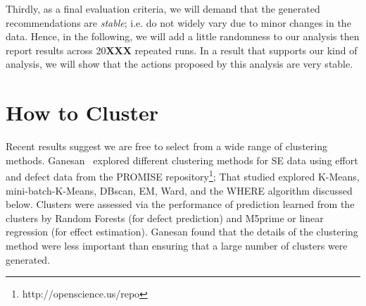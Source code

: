 \documentclass[conference]{IEEEtran}
\begin{document}
Thirdly, as a final evaluation criteria, we will demand that the generated recommendations are {\em stable}; i.e. do not widely vary due to minor changes in the data. Hence, in the following, we will add a little randomness to our analysis then report results across 20{\bf XXX} repeated runs. In a result that supports our kind of analysis, we will show that the actions proposed by this analysis are very stable.

	
	\section{How to Cluster}
	Recent results suggest  we are free to select from a wide range of 
	clustering methods.  Ganesan~\cite{div14} explored 
	different clustering methods for SE data using   effort and defect data from
	the PROMISE repository\footnote{http://openscience.us/repo};
	That studied explored
	K-Means, mini-batch-K-Means, DBscan, EM, Ward, and the WHERE algorithm discussed
	below.
	Clusters were assessed via the performance of prediction 
	learned from the clusters by Random Forests (for defect prediction)
	and M5prime or linear regression (for effect estimation).  Ganesan found
	that the details of the clustering method were less important than ensuring that  a large number of clusters were generated.
	
\end{document}
